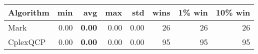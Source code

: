 \begin{tabular}{lrrrrrrr}
Algorithm & min & avg & max & std
& wins & 1\% win & 10\% win 
\\
\hline
Mark&0.00& \bf0.00& 0.00& 0.00&26&26&26\\
CplexQCP&0.00& \bf0.00& 0.00& 0.00&95&95&95
\end{tabular}
